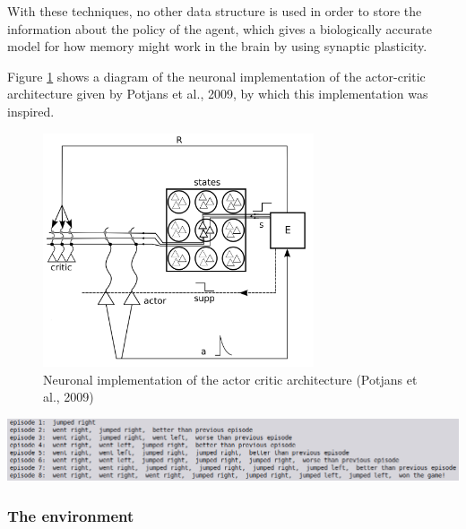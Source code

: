 \documentclass[10pt]{article}
\begin{document}
    \setcounter{figure}{6}

    \newpage
    With these techniques, no other data structure is used in order to store the information about the policy of the agent, which gives a biologically accurate model for how memory might work in the brain by using synaptic plasticity.

    Figure \ref{fig:potjansImplementation} shows a diagram of the neuronal implementation of the actor-critic architecture given by Potjans et al., 2009, by which this implementation was inspired.

    \begin{figure}[ht!]
    \centering
    \includegraphics[width=80mm]{./implementation.png}
    \caption{Neuronal implementation of the actor critic architecture (Potjans et al., 2009)}
    \label{fig:potjansImplementation}
    \end{figure}

    \setcounter{suppfigure}{8}
    \begin{suppfigure*}[b]
    \center
    \includegraphics[width=180mm]{./history.png}
    \caption{Logs showing the activity of the agent and the evaluation of the critic over learning episodes}
    \label{fig:history}
    \end{suppfigure*}

    \subsubsection{The environment}
\end{document}
